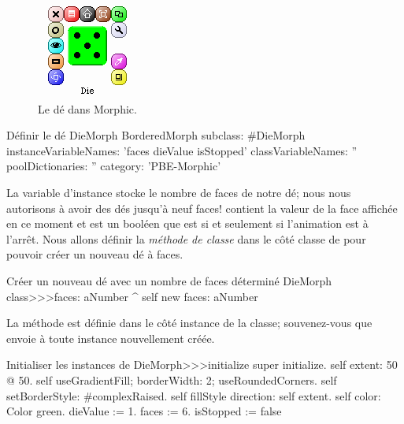 \documentclass[a4paper,10pt,twoside]{book}
\begin{document}
\begin{figure}[ht]
	\centerline{\includegraphics[scale=0.65]{die}}
	\caption{Le dé dans Morphic.}
\end{figure}


\begin{classdef}{Définir le dé DieMorph}
BorderedMorph subclass: #DieMorph
	instanceVariableNames: 'faces dieValue isStopped'
	classVariableNames: ''
	poolDictionaries: ''
	category: 'PBE-Morphic'
\end{classdef}

La variable d'instance  stocke le nombre de faces de notre
dé; nous nous autorisons à avoir des dés jusqu'à neuf faces!
 contient la valeur de la face affichée en ce moment et
 est un booléen que est  si et seulement si
l'animation est à l'arrêt.
Nous allons définir la \emph{méthode de classe}  dans
le côté classe de  pour pouvoir créer un
nouveau dé à  faces.

\begin{method}{Créer un nouveau dé avec un nombre de faces déterminé}
DieMorph class>>>faces: aNumber
	^ self new faces: aNumber
\end{method}

La méthode  est définie dans le côté instance
de la classe; souvenez-vous que  envoie  à
toute instance nouvellement créée.

\begin{method}{Initialiser les instances de }
DieMorph>>>initialize
	super initialize.
	self extent: 50 @ 50.
	self useGradientFill; borderWidth: 2; useRoundedCorners.
	self setBorderStyle: #complexRaised.
	self fillStyle direction: self extent.
	self color: Color green.
	dieValue := 1.
	faces := 6.
	isStopped := false
\end{method}
\end{document}
